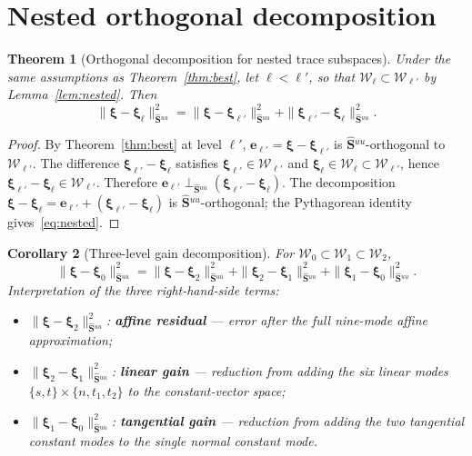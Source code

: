 \documentclass[11pt,a4paper]{article}
\newtheorem{theorem}{Theorem}[section]
\newtheorem{corollary}[theorem]{Corollary}
\theoremstyle{definition}
\newcommand{\Schur}{\mathbf{S}}
\newcommand{\Shatuu}{\widehat{\Schur}{}^{uu}}
\newcommand{\Wspace}{\mathcal{W}}
\begin{document}
\section{Nested orthogonal decomposition}

\begin{theorem}[Orthogonal decomposition for nested trace subspaces]\label{thm:nested}
  Under the same assumptions as Theorem~\ref{thm:best}, let
  $\ell < \ell'$, so that $\Wspace_\ell \subset \Wspace_{\ell'}$ by
  Lemma~\ref{lem:nested}.  Then
  \begin{equation}\label{eq:nested}
    \|\bm{\xi} - \bm{\xi}_\ell\|_{\Shatuu}^2
    = \|\bm{\xi} - \bm{\xi}_{\ell'}\|_{\Shatuu}^2
      + \|\bm{\xi}_{\ell'} - \bm{\xi}_\ell\|_{\Shatuu}^2.
  \end{equation}
\end{theorem}

\begin{proof}
  By Theorem~\ref{thm:best} at level $\ell'$,
  $\bm{e}_{\ell'} = \bm{\xi} - \bm{\xi}_{\ell'}$ is
  $\Shatuu$-orthogonal to $\Wspace_{\ell'}$.
  The difference $\bm{\xi}_{\ell'} - \bm{\xi}_\ell$ satisfies
  $\bm{\xi}_{\ell'} \in \Wspace_{\ell'}$ and
  $\bm{\xi}_\ell \in \Wspace_\ell \subset \Wspace_{\ell'}$,
  hence $\bm{\xi}_{\ell'} - \bm{\xi}_\ell \in \Wspace_{\ell'}$.
  Therefore $\bm{e}_{\ell'} \perp_{\Shatuu}
  (\bm{\xi}_{\ell'} - \bm{\xi}_\ell)$.
  The decomposition
  $\bm{\xi} - \bm{\xi}_\ell = \bm{e}_{\ell'} +
   (\bm{\xi}_{\ell'} - \bm{\xi}_\ell)$
  is $\Shatuu$-orthogonal; the Pythagorean identity gives~\eqref{eq:nested}.
\end{proof}

\begin{corollary}[Three-level gain decomposition]\label{cor:gains}
  For $\Wspace_0 \subset \Wspace_1 \subset \Wspace_2$,
  \begin{equation}\label{eq:gains}
    \|\bm{\xi} - \bm{\xi}_0\|_{\Shatuu}^2
    = \|\bm{\xi} - \bm{\xi}_2\|_{\Shatuu}^2
      + \|\bm{\xi}_2 - \bm{\xi}_1\|_{\Shatuu}^2
      + \|\bm{\xi}_1 - \bm{\xi}_0\|_{\Shatuu}^2.
  \end{equation}
  Interpretation of the three right-hand-side terms:
  \begin{itemize}
    \item $\|\bm{\xi} - \bm{\xi}_2\|_{\Shatuu}^2$:
      \textbf{affine residual} --- error after the full nine-mode
      affine approximation;
    \item $\|\bm{\xi}_2 - \bm{\xi}_1\|_{\Shatuu}^2$:
      \textbf{linear gain} --- reduction from adding the six linear
      modes $\{s,t\}\times\{n,t_1,t_2\}$ to the constant-vector space;
    \item $\|\bm{\xi}_1 - \bm{\xi}_0\|_{\Shatuu}^2$:
      \textbf{tangential gain} --- reduction from adding the two
      tangential constant modes to the single normal constant mode.
  \end{itemize}
\end{corollary}
\end{document}
